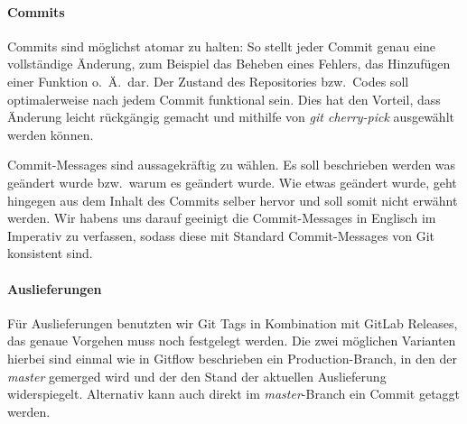 \paragraph{Commits}
Commits sind möglichst atomar zu halten:
So stellt jeder Commit genau eine vollständige Änderung, zum Beispiel das Beheben eines
Fehlers, das Hinzufügen einer Funktion o.\ Ä.\ dar.
Der Zustand des Repositories bzw.\ Codes soll optimalerweise nach jedem Commit funktional sein.
Dies hat den Vorteil, dass Änderung leicht rückgängig gemacht und mithilfe von
\textit{git cherry-pick} ausgewählt werden können.

Commit-Messages sind aussagekräftig zu wählen.
Es soll beschrieben werden was geändert wurde bzw.\ warum es geändert wurde.
Wie etwas geändert wurde, geht hingegen aus dem Inhalt des Commits selber hervor und soll somit
nicht erwähnt werden.
Wir habens uns darauf geeinigt die Commit-Messages in Englisch im Imperativ zu verfassen, sodass
diese mit Standard Commit-Messages von Git konsistent sind.

\paragraph{Auslieferungen}\label{subsec:auslieferungen}
Für Auslieferungen benutzten wir Git Tags in Kombination mit GitLab Releases, das genaue Vorgehen
muss noch festgelegt werden.
Die zwei möglichen Varianten hierbei sind einmal wie in Gitflow beschrieben ein
Production-Branch, in den der \textit{master} gemerged wird und der den Stand der aktuellen Auslieferung
widerspiegelt.
Alternativ kann auch direkt im \textit{master}-Branch ein Commit getaggt werden.
